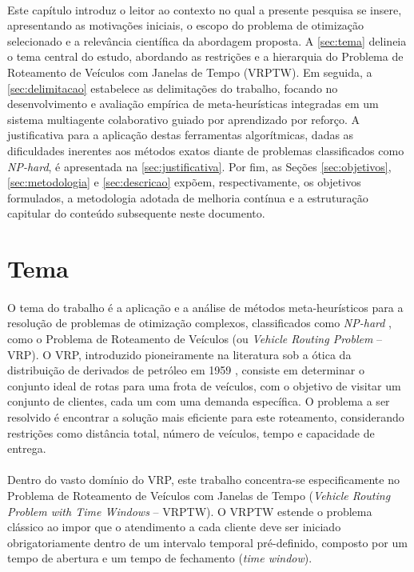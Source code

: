 \paragraph{}Este capítulo introduz o leitor ao contexto no qual a presente pesquisa se insere, apresentando as motivações iniciais, o escopo do problema de otimização selecionado e a relevância científica da abordagem proposta. A \autoref{sec:tema} delineia o tema central do estudo, abordando as restrições e a hierarquia do Problema de Roteamento de Veículos com Janelas de Tempo (VRPTW). Em seguida, a \autoref{sec:delimitacao} estabelece as delimitações do trabalho, focando no desenvolvimento e avaliação empírica de meta-heurísticas integradas em um sistema multiagente colaborativo guiado por aprendizado por reforço. A justificativa para a aplicação destas ferramentas algorítmicas, dadas as dificuldades inerentes aos métodos exatos diante de problemas classificados como \textit{NP-hard}, é apresentada na \autoref{sec:justificativa}. Por fim, as Seções \ref{sec:objetivos}, \ref{sec:metodologia} e \ref{sec:descricao} expõem, respectivamente, os objetivos formulados, a metodologia adotada de melhoria contínua e a estruturação capitular do conteúdo subsequente neste documento.

\section{Tema}
\label{sec:tema}

\paragraph{}O tema do trabalho é a aplicação e a análise de métodos meta-heurísticos para a resolução de problemas de otimização complexos, classificados como \textit{NP-hard} \cite{Garey79}, como o Problema de Roteamento de Veículos (ou \textit{Vehicle Routing Problem} -- VRP). O VRP, introduzido pioneiramente na literatura sob a ótica da distribuição de derivados de petróleo em 1959 \cite{Dantzig59}, consiste em determinar o conjunto ideal de rotas para uma frota de veículos, com o objetivo de visitar um conjunto de clientes, cada um com uma demanda específica. O problema a ser resolvido é encontrar a solução mais eficiente para este roteamento, considerando restrições como distância total, número de veículos, tempo e capacidade de entrega.

\paragraph{}Dentro do vasto domínio do VRP, este trabalho concentra-se especificamente no Problema de Roteamento de Veículos com Janelas de Tempo (\textit{Vehicle Routing Problem with Time Windows} -- VRPTW). O VRPTW estende o problema clássico ao impor que o atendimento a cada cliente deve ser iniciado obrigatoriamente dentro de um intervalo temporal pré-definido, composto por um tempo de abertura e um tempo de fechamento (\textit{time window}).



